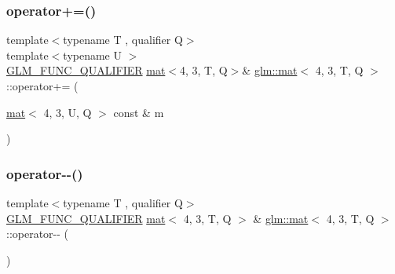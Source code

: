 \subsubsection{\texorpdfstring{operator+=()}{operator+=()}\hspace{0.1cm}{\footnotesize\ttfamily [4/4]}}
{\footnotesize\ttfamily template$<$typename T , qualifier Q$>$ \\
template$<$typename U $>$ \\
\hyperlink{setup_8hpp_a33fdea6f91c5f834105f7415e2a64407}{G\+L\+M\+\_\+\+F\+U\+N\+C\+\_\+\+Q\+U\+A\+L\+I\+F\+I\+ER} \hyperlink{structglm_1_1mat}{mat}$<$4, 3, T, Q$>$\& \hyperlink{structglm_1_1mat}{glm\+::mat}$<$ 4, 3, T, Q $>$\+::operator+= (\begin{DoxyParamCaption}\item[{\hyperlink{structglm_1_1mat}{mat}$<$ 4, 3, U, Q $>$ const \&}]{m }\end{DoxyParamCaption})}

\mbox{\label{structglm_1_1mat_3_014_00_013_00_01_t_00_01_q_01_4_aaa6df2edca16cfac23a2806f2fd8ae61}} 
\subsubsection{\texorpdfstring{operator-\/-\/()}{operator--()}\hspace{0.1cm}{\footnotesize\ttfamily [1/2]}}
{\footnotesize\ttfamily template$<$typename T , qualifier Q$>$ \\
\hyperlink{setup_8hpp_a33fdea6f91c5f834105f7415e2a64407}{G\+L\+M\+\_\+\+F\+U\+N\+C\+\_\+\+Q\+U\+A\+L\+I\+F\+I\+ER} \hyperlink{structglm_1_1mat}{mat}$<$ 4, 3, T, Q $>$ \& \hyperlink{structglm_1_1mat}{glm\+::mat}$<$ 4, 3, T, Q $>$\+::operator-\/-\/ (\begin{DoxyParamCaption}{ }\end{DoxyParamCaption})}

\mbox{\label{structglm_1_1mat_3_014_00_013_00_01_t_00_01_q_01_4_a1071ca01aa47be09af44bbff97d99639}} 

